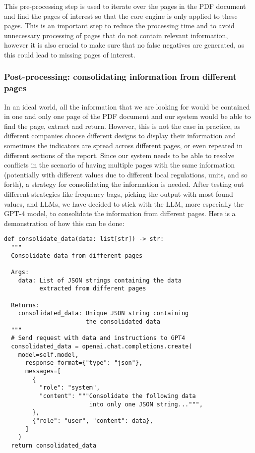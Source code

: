 \documentclass[english, 12pt, a4paper, elec, utf8, a-2b, online]{aaltothesis}
\begin{document}
This pre-processing step is used to iterate over the pages in the \ac{PDF} document and find the pages of interest so that the core engine is only applied to these pages.
This is an important step to reduce the processing time and to avoid unnecessary processing of pages that do not contain relevant information, however it is also crucial to make sure that no false negatives are generated, as this could lead to missing pages of interest.

\subsubsection{Post-processing: consolidating information from different pages}

In an ideal world, all the information that we are looking for would be contained in one and only one page of the \ac{PDF} document and our system would be able to find the page, extract and return.
However, this is not the case in practice, as different companies choose different designs to display their information and sometimes the indicators are spread across different pages, or even repeated in different sections of the report.
Since our system needs to be able to resolve conflicts in the scenario of having multiple pages with the same information (potentially with different values due to different local regulations, units, and so forth), a strategy for consolidating the information is needed.
After testing out different strategies like frequency bags, picking the output with most found values, and \ac{LLM}s, we have decided to stick with the \ac{LLM}, more especially the \ac{GPT}-4 model, to consolidate the information from different pages.
Here is a demonstration of how this can be done:

\begin{verbatim}
def consolidate_data(data: list[str]) -> str:
  """
  Consolidate data from different pages

  Args:
    data: List of JSON strings containing the data
          extracted from different pages

  Returns:
    consolidated_data: Unique JSON string containing
                       the consolidated data
  """
  # Send request with data and instructions to GPT4
  consolidated_data = openai.chat.completions.create(
    model=self.model,
      response_format={"type": "json"},
      messages=[
        {
          "role": "system",
          "content": """Consolidate the following data
                        into only one JSON string...""",
        },
        {"role": "user", "content": data},
      ]
    )
  return consolidated_data
\end{verbatim}
\end{document}
